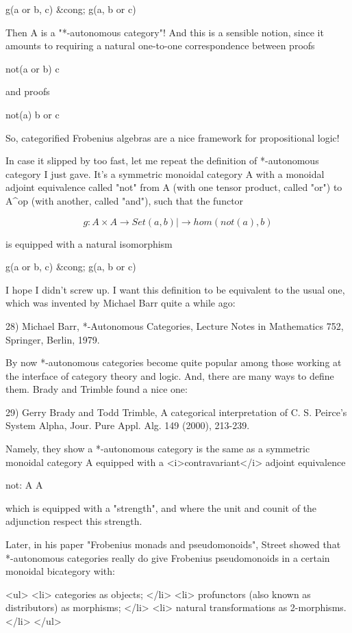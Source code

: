 g(a or b, c) &cong; g(a, b or c)

Then A is a "*-autonomous category"!  And this is 
a sensible notion, since it amounts to requiring a natural
one-to-one correspondence between proofs

not(a or b) \to  c

and proofs

not(a) \to  b or c

So, categorified Frobenius algebras are a nice framework for
propositional logic!

In case it slipped by too fast, let me repeat the definition of
*-autonomous category I just gave.  It's a symmetric monoidal
category A with a monoidal adjoint
equivalence called "not" from A (with one tensor product,
called "or") to A^{op} (with another, called 
"and"), such that the functor 

$$
g: A \times  A  \to  Set
   (a,b) |\to  hom(not(a),b)
$$
    

is equipped with a natural isomorphism 

g(a or b, c) &cong; g(a, b or c)

I hope I didn't screw up.  I want this definition to
be equivalent to the usual one,
which was invented by Michael Barr quite a while ago:

28) Michael Barr, *-Autonomous Categories, Lecture Notes in 
Mathematics 752, Springer, Berlin, 1979.

By now *-autonomous categories become quite popular among those
working at the interface of category theory and logic.  And, there
are many ways to define them.  Brady and Trimble found a nice one:

29) Gerry Brady and Todd Trimble, A categorical interpretation 
of C. S. Peirce's System Alpha, Jour. Pure Appl. Alg. 149
(2000), 213-239.  

Namely, they show a *-autonomous category is the same as a symmetric
monoidal category A equipped with a <i>contravariant</i> 
adjoint equivalence

not: A \to  A 

which is equipped with a "strength", and where the unit and counit of 
the adjunction respect this strength.

Later, in his paper "Frobenius monads and pseudomonoids", Street 
showed that *-autonomous categories really do give Frobenius 
pseudomonoids in a certain monoidal bicategory with:

<ul>
<li>
categories as objects;
</li>
<li>
profunctors (also known as distributors) as morphisms;
</li>
<li>
natural transformations as 2-morphisms.
</li>
</ul>

